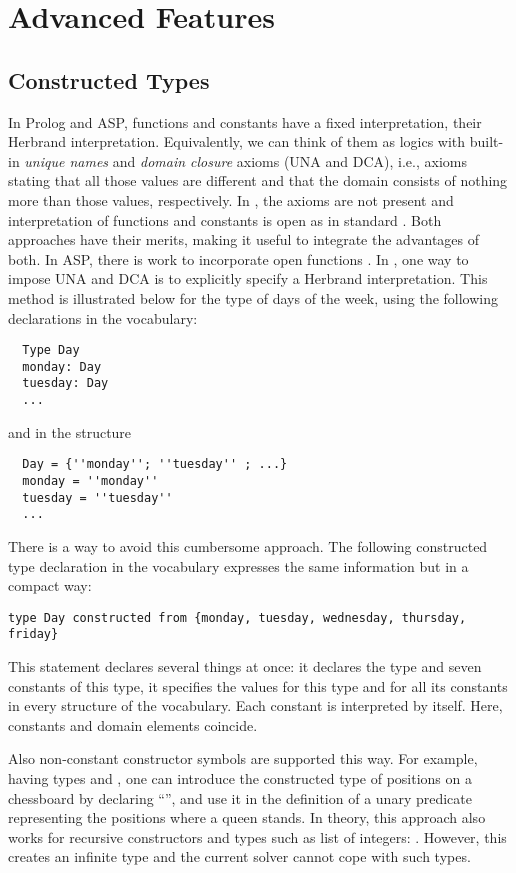 \section{Advanced Features}\label{sec:advanced}

\subsection{Constructed Types}
In Prolog and ASP, functions and constants have a fixed
interpretation, their Herbrand interpretation. Equivalently, we can
think of them as logics with built-in \emph{unique names} and
\emph{domain closure} axioms (UNA and DCA), i.e., axioms stating that all those values are different and that the domain consists of nothing more than those values, respectively. In \foidaggpft, the axioms
are not present and interpretation of functions and constants is open
as in standard \FO. Both approaches  have their merits, making it useful to integrate the advantages of both. In ASP, there is work to
incorporate open functions \cite{kr/BartholomewL12,kr/Lifschitz12}. In
\foidaggpft, one way to impose UNA and DCA  is to explicitly specify a Herbrand interpretation. This method is illustrated below for the type of  days of the week, using the following declarations in the vocabulary:
\begin{lstlisting}
  Type Day
  monday: Day
  tuesday: Day
  ...
\end{lstlisting}
and in the structure
\begin{lstlisting}
  Day = {''monday''; ''tuesday'' ; ...}
  monday = ''monday''
  tuesday = ''tuesday''
  ...
\end{lstlisting}
There is a way to avoid this cumbersome approach.
The following constructed type declaration in the vocabulary expresses the same information but in a compact way:
\begin{lstlisting}
type Day constructed from {monday, tuesday, wednesday, thursday, friday}
\end{lstlisting}
This statement declares several things at once: it declares the type
 and seven constants of this type, it specifies the values for
this type and for all its constants in every structure of the
vocabulary.  Each constant is interpreted by itself.  Here,
constants and domain elements coincide.

Also non-constant constructor  symbols are  supported this way. For example, having types  and , one can
introduce the constructed type of positions on a chessboard by declaring ``'', and use it in the definition of a unary predicate  representing the positions where  a queen stands. In theory, this approach also
works for recursive constructors and types such as list of integers:
. However,
this creates an infinite type and the current \idp solver cannot cope
with such types.
















